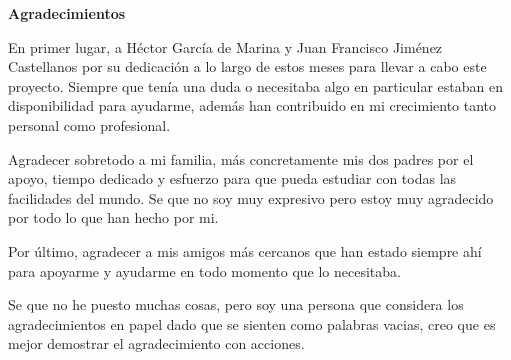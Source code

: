 \newpage
\setlength{\parindent}{0cm}
\begin{center}
{\bf \Huge Agradecimientos}
\end{center}
\vspace{1cm}
\setlength{\baselineskip}{0.8cm}

En primer lugar, a Héctor García de Marina y Juan Francisco Jiménez Castellanos por su dedicación a lo largo de estos meses para llevar a cabo este proyecto. Siempre que tenía una duda o necesitaba algo en particular estaban en disponibilidad para ayudarme, además han contribuido en mi crecimiento tanto personal como profesional.

\vspace{0.5cm}

Agradecer sobretodo a mi familia, más concretamente mis dos padres por el apoyo, tiempo dedicado y esfuerzo para que pueda estudiar con todas las facilidades del mundo. Se que no soy muy expresivo pero estoy muy agradecido por todo lo que han hecho por mi.

\vspace{0.5cm}

Por último, agradecer a mis amigos más cercanos que han estado siempre ahí para apoyarme y ayudarme en todo momento que lo necesitaba.

\vspace{0.5cm}

Se que no he puesto muchas cosas, pero soy una persona que considera los agradecimientos en papel dado que se sienten como palabras vacias, creo que es mejor demostrar el agradecimiento con acciones.